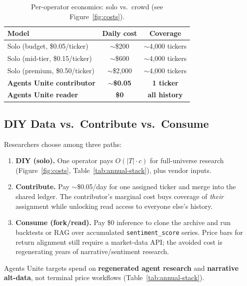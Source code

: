 \documentclass[10pt,twocolumn]{article}
\begin{document}
\begin{table}[h]
\centering
\caption{Per-operator economics: solo vs.\ crowd (see Figure~\ref{fig:costs}).}
\label{tab:economics}
\small
\begin{tabular}{@{}lcc@{}}
\toprule
\textbf{Model} & \textbf{Daily cost} & \textbf{Coverage} \\
\midrule
Solo (budget, \$0.05/ticker) & $\sim$\$200 & $\sim$4{,}000 tickers \\
Solo (mid-tier, \$0.15/ticker) & $\sim$\$600 & $\sim$4{,}000 tickers \\
Solo (premium, \$0.50/ticker) & $\sim$\$2{,}000 & $\sim$4{,}000 tickers \\
\textbf{Agents Unite contributor} & \textbf{$\sim$\$0.05} & \textbf{1 ticker} \\
\textbf{Agents Unite reader} & \textbf{\$0} & \textbf{all history} \\
\bottomrule
\end{tabular}
\end{table}

\subsection{DIY Data vs.\ Contribute vs.\ Consume}
\label{sec:monetary}

Researchers choose among three paths:

\begin{enumerate}[label=\arabic*.]
  \item \textbf{DIY (solo).} One operator pays $O(|T|\cdot c)$ for full-universe research (Figure~\ref{fig:costs}, Table~\ref{tab:annual-stack}), plus vendor inputs.
  \item \textbf{Contribute.} Pay $\sim$\$0.05/day for one assigned ticker and merge into the shared ledger. The contributor's marginal cost buys coverage of \emph{their} assignment while unlocking read access to everyone else's history.
  \item \textbf{Consume (fork/read).} Pay \$0 inference to clone the archive and run backtests or RAG over accumulated \texttt{sentiment\_score} series. Price bars for return alignment still require a market-data API; the avoided cost is regenerating years of narrative/sentiment research.
\end{enumerate}

Agents Unite targets spend on \textbf{regenerated agent research} and \textbf{narrative alt-data}, not terminal price workflows (Table~\ref{tab:annual-stack}).
\end{document}
